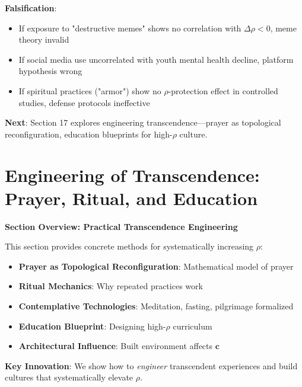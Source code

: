 \documentclass[11pt,a4paper]{article}
\theoremstyle{definition}
\theoremstyle{remark}
\newcommand{\cc}{\mathbf{c}}
\begin{document}
\begin{small}
\begin{enumerate}
\begin{protocol}
\begin{mdframed}[backgroundcolor=green!10,linewidth=2pt,linecolor=green!70!black]
\textbf{Falsification}:
\begin{itemize}[nosep]
    \item If exposure to "destructive memes" shows no correlation with \(\Delta\rho < 0\), meme theory invalid
    \item If social media use uncorrelated with youth mental health decline, platform hypothesis wrong
    \item If spiritual practices ("armor") show no \(\rho\)-protection effect in controlled studies, defense protocols ineffective
\end{itemize}

\textbf{Next}: Section 17 explores engineering transcendence—prayer as topological reconfiguration, education blueprints for high-\(\rho\) culture.
\end{mdframed}


\section{Engineering of Transcendence: Prayer, Ritual, and Education}

\begin{mdframed}[backgroundcolor=cyan!5,linewidth=2pt]
\textbf{Section Overview: Practical Transcendence Engineering}

This section provides concrete methods for systematically increasing \(\rho\):

\begin{itemize}[nosep]
    \item \textbf{Prayer as Topological Reconfiguration}: Mathematical model of prayer
    \item \textbf{Ritual Mechanics}: Why repeated practices work
    \item \textbf{Contemplative Technologies}: Meditation, fasting, pilgrimage formalized
    \item \textbf{Education Blueprint}: Designing high-\(\rho\) curriculum
    \item \textbf{Architectural Influence}: Built environment affects \(\cc\)
\end{itemize}

\textbf{Key Innovation}: We show how to \textit{engineer} transcendent experiences and build cultures that systematically elevate \(\rho\).
\end{mdframed}


\end{protocol}
\end{enumerate}
\end{small}
\end{document}
